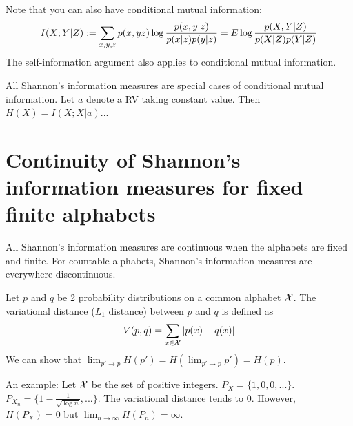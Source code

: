 \documentclass[../main.tex]{subfiles}
\begin{document}
Note that you can also have conditional mutual information: \begin{equation*}
    I(X;Y|Z):= \sum_{x,y,z} p(x,yz)\log \frac{p(x,y|z)}{p(x|z)p(y|z)} = E\log\frac{p(X,Y|Z)}{p(X|Z)p(Y|Z)}
\end{equation*}
The self-information argument also applies to conditional mutual information.
\begin{remark}
    All Shannon's information measures are special cases of conditional mutual information. Let $a$ denote a RV taking constant value.
    Then $H(X)=I(X;X|a)$...
\end{remark}
\section{Continuity of Shannon's information measures for fixed finite alphabets}
All Shannon's information measures are continuous when the alphabets are fixed and finite. For countable alphabets, Shannon's information measures are everywhere discontinuous.
\begin{definition}
    Let $p$ and $q$ be 2 probability distributions on a common alphabet $\mathcal{X}$. The variational distance ($L_1$ distance) between $p$ and $q$ is defined as \begin{equation*}
        V(p,q)=\sum_{x\in\mathcal{X}}|p(x)-q(x)|
    \end{equation*}
    We can show that $\lim_{p'\to p} H(p')=H(\lim_{p'\to p}p')=H(p)$.
\end{definition}
    An example: Let $\mathcal{X}$ be the set of positive integers. $P_X = \{1,0,0,...\}$. $P_{X_n} = \{ 1-\frac{1}{\sqrt{\log n}},... \}$. The variational distance tends to 0. However, $H(P_X)=0$ but $\lim_{n\to\infty}H(P_n)=\infty$.
\end{document}

